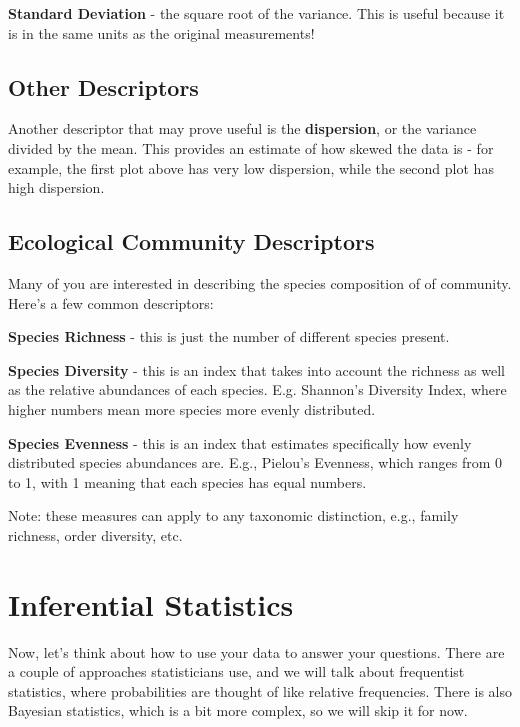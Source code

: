 \documentclass[
  letterpaper,
  DIV=11,
  numbers=noendperiod]{scrreprt}
\begin{document}
\textbf{Standard Deviation} - the square root of the variance. This is
useful because it is in the same units as the original measurements!

\section{Other Descriptors}\label{other-descriptors}

Another descriptor that may prove useful is the \textbf{dispersion}, or
the variance divided by the mean. This provides an estimate of how
skewed the data is - for example, the first plot above has very low
dispersion, while the second plot has high dispersion.

\section{Ecological Community
Descriptors}\label{ecological-community-descriptors}

Many of you are interested in describing the species composition of of
community. Here's a few common descriptors:

\textbf{Species Richness} - this is just the number of different species
present.

\textbf{Species Diversity} - this is an index that takes into account
the richness as well as the relative abundances of each species. E.g.
Shannon's Diversity Index, where higher numbers mean more species more
evenly distributed.

\textbf{Species Evenness} - this is an index that estimates specifically
how evenly distributed species abundances are. E.g., Pielou's Evenness,
which ranges from 0 to 1, with 1 meaning that each species has equal
numbers.

Note: these measures can apply to any taxonomic distinction, e.g.,
family richness, order diversity, etc.

\chapter{Inferential Statistics}\label{inferential-statistics}

Now, let's think about how to use your data to answer your questions.
There are a couple of approaches statisticians use, and we will talk
about frequentist statistics, where probabilities are thought of like
relative frequencies. There is also Bayesian statistics, which is a bit
more complex, so we will skip it for now.
\end{document}
